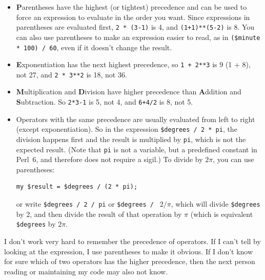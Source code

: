 \begin{itemize}

\item {\bf P}arentheses have the highest (or tightest) precedence and can be used 
to force an expression to evaluate in the order you want. Since
expressions in parentheses are evaluated first, {\tt 2 * (3-1)} is 4,
and {\tt (1+1)**(5-2)} is 8. You can also use parentheses to make an
expression easier to read, as in {\tt (\$minute * 100) / 60}, even
if it doesn't change the result.

\item {\bf E}xponentiation has the next highest precedence, so
{\tt 1 + 2**3} is 9 (1 + 8), not 27, and {\tt 2 * 3**2} is 18, not 36.

\item {\bf M}ultiplication and {\bf D}ivision have higher precedence
  than {\bf A}ddition and {\bf S}ubtraction.  So {\tt 2*3-1} is 5, not
  4, and {\tt 6+4/2} is 8, not 5.

\item Operators with the same precedence are usually evaluated 
from left to right (except exponentiation).  So in the expression 
{\tt \$degrees / 2 * pi}, the division happens first and the 
result is multiplied by {\tt pi}, which is not the expected 
result. (Note that {\tt pi} is not a variable, but a predefined 
constant in Perl~6, and therefore does not require a sigil.)  To 
divide by $2 \pi$, you can use parentheses:
  
\begin{verbatim}
my $result = $degrees / (2 * pi);  
\end{verbatim}  
 
or write
  {\tt \$degrees / 2 / pi} or {\tt \$degrees / } $2 / \pi$, which 
  will divide \verb'$degrees' by 2, and then divide the result of 
  that operation by $\pi$ (which is equivalent \verb'$degrees' by 
   $2 \pi$.

\end{itemize}

I don't work very hard to remember the precedence of
operators.  If I can't tell by looking at the expression, I use
parentheses to make it obvious. If I don't know for sure which of two operators 
has the higher precedence, then the next person reading or maintaining 
my code may also not know.


